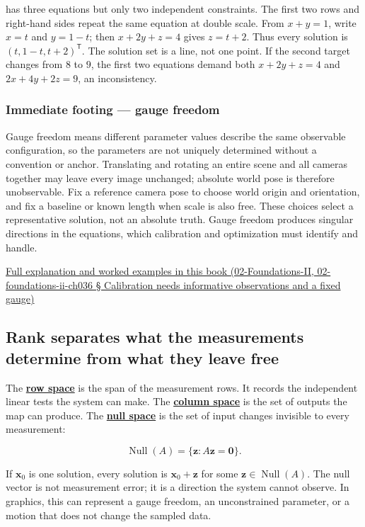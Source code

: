 has three equations but only two independent constraints. The first two rows and right-hand sides repeat the same equation at double scale. From \(x+y=1\), write \(x=t\) and \(y=1-t\); then \(x+2y+z=4\) gives \(z=t+2\). Thus every solution is \((t,1-t,t+2)^\mathsf T\). The solution set is a line, not one point. If the second target changes from \(8\) to \(9\), the first two equations demand both \(x+2y+z=4\) and \(2x+4y+2z=9\), an inconsistency.

\subsubsection{Immediate footing --- gauge freedom}\label{immediate-footing-gauge-freedom}

Gauge freedom means different parameter values describe the same observable configuration, so the parameters are not uniquely determined without a convention or anchor. Translating and rotating an entire scene and all cameras together may leave every image unchanged; absolute world pose is therefore unobservable. Fix a reference camera pose to choose world origin and orientation, and fix a baseline or known length when scale is also free. These choices select a representative solution, not an absolute truth. Gauge freedom produces singular directions in the equations, which calibration and optimization must identify and handle.

\href{}{Full explanation and worked examples in this book (02-Foundations-II, 02-foundations-ii-ch036 § Calibration needs informative observations and a fixed gauge)}

\subsection{Rank separates what the measurements determine from what they leave free}\label{rank-separates-what-the-measurements-determine-from-what-they-leave-free}

The \textbf{\hyperref[01-foundations-i-ch019]{row space}} is the span of the measurement rows. It records the independent linear tests the system can make. The \textbf{\hyperref[01-foundations-i-ch019]{column space}} is the set of outputs the map can produce. The \textbf{\hyperref[01-foundations-i-ch019]{null space}} is the set of input changes invisible to every measurement:

\[
\operatorname{Null}(A)=\{\mathbf z:A\mathbf z=\mathbf0\}.
\]

If \(\mathbf x_0\) is one solution, every solution is \(\mathbf x_0+\mathbf z\) for some \(\mathbf z\in\operatorname{Null}(A)\). The null vector is not measurement error; it is a direction the system cannot observe. In graphics, this can represent a gauge freedom, an unconstrained parameter, or a motion that does not change the sampled data.

